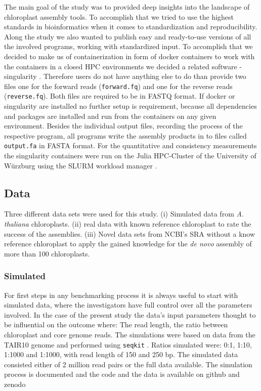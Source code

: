The main goal of the study was to provided deep insights into the landscape of chloroplast assembly tools. To
accomplish that we tried to use the highest standards in bioinformatics when it comes to standardization and
reproducibility. Along the study we also wanted to publish easy and ready-to-use versions of all the involved
programs, working with standardized input. To accomplish that we decided to make us of containerization in
form of docker containers \cite{merkel2014docker} to work with the containers in a closed HPC environments we
decided a related software - singularity \cite{kurtzer2017singularity}. Therefore users do not have anything
else to do than provide two files one for the forward reads (\texttt{forward.fq}) and one for the reverse
reads (\texttt{reverse.fq}). Both files are required to be in FASTQ format. If docker or singularity are
installed no further setup is requirement, because all dependencies and packages are installed and run from
the containers on any given environment. Besides the individual output files, recording the process of the
respective program, all programs write the assembly products in to files called \texttt{output.fa} in FASTA
format.  For the quantitative and consistency measurements the singularity containers were run on the Julia
HPC-Cluster of the University of W\"{u}rzburg using the SLURM workload manager \cite{Jette02slurm}.


\subsection{Data}
Three different data sets were used for this study. (i) Simulated data from \textit{A. thaliana}
chloroplasts. (ii) real data with known reference chloroplast to rate the success of the assemblies. (iii)
Novel data sets from NCBI's SRA without a know reference chloroplast to apply the gained knowledge for the
\textit{de novo} assembly of more than 100 chloroplasts.

\subsubsection{Simulated}

For first steps in any benchmarking process it is always useful to start with simulated data, where the investigators have full control over all the parameters involved. In the case of the present study the data's input parameters thought to be influential on the outcome where: The read length, the ratio between chloroplast and core genome reads. The simulations were based on data from the TAIR10 genome \cite{tair10} and performed using \texttt{seqkit} \cite{seqkit}. Ratios simulated were: 0:1, 1:10, 1:1000 and 1:1000, with read length of 150 and 250 bp. The simulated data consisted either of 2 million read pairs or the full data available. The simulation process is documented and the code and the data is available on github and zenodo \cite{zenododataset}

